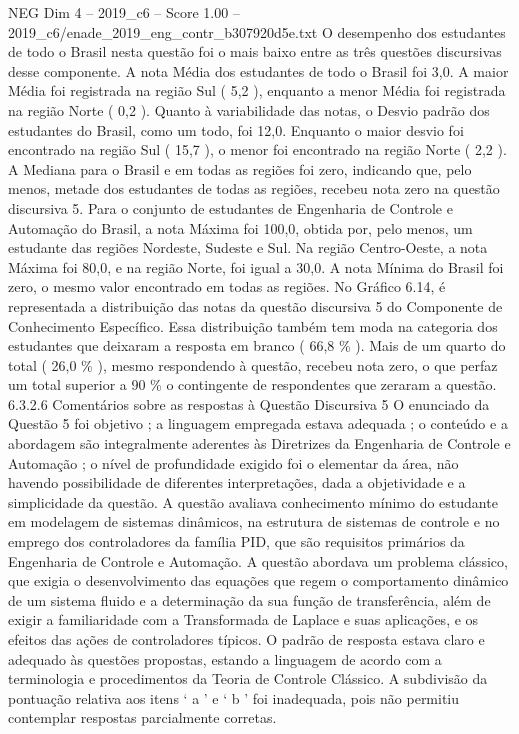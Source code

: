 \begin{textsample}{NEG Dim 4 – 2019\_c6 – Score 1.00 – 2019\_c6/enade\_2019\_eng\_contr\_b307920d5e.txt}
O desempenho dos estudantes de todo o Brasil nesta questão foi o mais baixo entre as três questões discursivas desse componente.
A nota Média dos estudantes de todo o Brasil foi 3,0.
A maior Média foi registrada na região Sul ( 5,2 ), enquanto a menor Média foi registrada na região Norte ( 0,2 ).
Quanto à variabilidade das notas, o Desvio padrão dos estudantes do Brasil, como um todo, foi 12,0.
Enquanto o maior desvio foi encontrado na região Sul ( 15,7 ), o menor foi encontrado na região Norte ( 2,2 ).
A Mediana para o Brasil e em todas as regiões foi zero, indicando que, pelo menos, metade dos estudantes de todas as regiões, recebeu nota zero na questão discursiva 5.
Para o conjunto de estudantes de Engenharia de Controle e Automação do Brasil, a nota Máxima foi 100,0, obtida por, pelo menos, um estudante das regiões Nordeste, Sudeste e Sul.
Na região Centro-Oeste, a nota Máxima foi 80,0, e na região Norte, foi igual a 30,0.
A nota Mínima do Brasil foi zero, o mesmo valor encontrado em todas as regiões.
No Gráfico 6.14, é representada a distribuição das notas da questão discursiva 5 do Componente de Conhecimento Específico.
Essa distribuição também tem moda na categoria dos estudantes que deixaram a resposta em branco ( 66,8 \% ).
Mais de um quarto do total ( 26,0 \% ), mesmo respondendo à questão, recebeu nota zero, o que perfaz um total superior a 90 \% o contingente de respondentes que zeraram a questão. 6.3.2.6 Comentários sobre as respostas à Questão Discursiva 5 O enunciado da Questão 5 foi objetivo ; a linguagem empregada estava adequada ; o conteúdo e a abordagem são integralmente aderentes às Diretrizes da Engenharia de Controle e Automação ; o nível de profundidade exigido foi o elementar da área, não havendo possibilidade de diferentes interpretações, dada a objetividade e a simplicidade da questão.
A questão avaliava conhecimento mínimo do estudante em modelagem de sistemas dinâmicos, na estrutura de sistemas de controle e no emprego dos controladores da família PID, que são requisitos primários da Engenharia de Controle e Automação.
A questão abordava um problema clássico, que exigia o desenvolvimento das equações que regem o comportamento dinâmico de um sistema fluido e a determinação da sua função de transferência, além de exigir a familiaridade com a Transformada de Laplace e suas aplicações, e os efeitos das ações de controladores típicos.
O padrão de resposta estava claro e adequado às questões propostas, estando a linguagem de acordo com a terminologia e procedimentos da Teoria de Controle Clássico.
A subdivisão da pontuação relativa aos itens ‘ a ’ e ‘ b ’ foi inadequada, pois não permitiu contemplar respostas parcialmente corretas.

\end{textsample}
